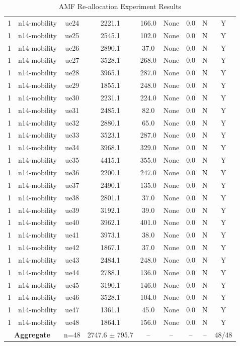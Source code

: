 \begin{table}[ht]
\begin{tabular}{|c|c|c|c|c|c|c|c|c|}
1 & n14-mobility & ue24 & 2221.1 & 166.0 & None & 0.0 & N & Y \\
1 & n14-mobility & ue25 & 2545.1 & 102.0 & None & 0.0 & N & Y \\
1 & n14-mobility & ue26 & 2890.1 & 37.0 & None & 0.0 & N & Y \\
1 & n14-mobility & ue27 & 3528.1 & 268.0 & None & 0.0 & N & Y \\
1 & n14-mobility & ue28 & 3965.1 & 287.0 & None & 0.0 & N & Y \\
1 & n14-mobility & ue29 & 1855.1 & 248.0 & None & 0.0 & N & Y \\
1 & n14-mobility & ue30 & 2231.1 & 224.0 & None & 0.0 & N & Y \\
1 & n14-mobility & ue31 & 2485.1 & 82.0 & None & 0.0 & N & Y \\
1 & n14-mobility & ue32 & 2880.1 & 65.0 & None & 0.0 & N & Y \\
1 & n14-mobility & ue33 & 3523.1 & 287.0 & None & 0.0 & N & Y \\
1 & n14-mobility & ue34 & 3968.1 & 329.0 & None & 0.0 & N & Y \\
1 & n14-mobility & ue35 & 4415.1 & 355.0 & None & 0.0 & N & Y \\
1 & n14-mobility & ue36 & 2200.1 & 247.0 & None & 0.0 & N & Y \\
1 & n14-mobility & ue37 & 2490.1 & 135.0 & None & 0.0 & N & Y \\
1 & n14-mobility & ue38 & 2801.1 & 37.0 & None & 0.0 & N & Y \\
1 & n14-mobility & ue39 & 3192.1 & 39.0 & None & 0.0 & N & Y \\
1 & n14-mobility & ue40 & 3962.1 & 401.0 & None & 0.0 & N & Y \\
1 & n14-mobility & ue41 & 3973.1 & 38.0 & None & 0.0 & N & Y \\
1 & n14-mobility & ue42 & 1867.1 & 37.0 & None & 0.0 & N & Y \\
1 & n14-mobility & ue43 & 2484.1 & 248.0 & None & 0.0 & N & Y \\
1 & n14-mobility & ue44 & 2788.1 & 136.0 & None & 0.0 & N & Y \\
1 & n14-mobility & ue45 & 3190.1 & 146.0 & None & 0.0 & N & Y \\
1 & n14-mobility & ue46 & 3528.1 & 104.0 & None & 0.0 & N & Y \\
1 & n14-mobility & ue47 & 1361.1 & 45.0 & None & 0.0 & N & Y \\
1 & n14-mobility & ue48 & 1864.1 & 156.0 & None & 0.0 & N & Y \\
\multicolumn{2}{|c|}{\textbf{Aggregate}} & n=48 & 2747.6 $\pm$ 795.7 & -- & -- & -- & -- & 48/48 \\
\hline
\end{tabular}
\caption{AMF Re-allocation Experiment Results}
\label{tab:amf_realloc}
\end{table}
